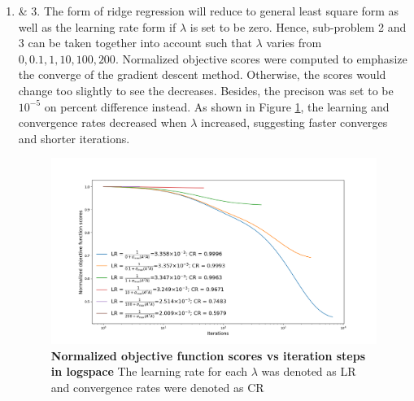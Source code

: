 \documentclass[11pt]{article}
\newcommand{\mfile}[1]  {{\small }} %
\begin{document}
\begin{enumerate}
		\item \& 3.
		The form of ridge regression will reduce to general least square form as well as the learning rate form if $\lambda$ is set to be zero. Hence, sub-problem 2 and 3 can be taken together into account such that $\lambda$ varies from $0,0.1,1,10,100,200$. Normalized objective scores were computed to emphasize the converge of the gradient descent method. Otherwise, the scores would change too slightly to see the decreases. Besides, the precison was set to be $10^{-5}$ on percent difference instead. As shown in Figure \ref{fig:p2}, the learning and convergence rates decreased when $\lambda$ increased, suggesting faster converges and shorter iterations.
		\begin{figure}
			\centering\includegraphics[width=.75\linewidth]{prob3.png}
			\caption{ \textbf{Normalized objective function scores vs iteration steps in logspace} The learning rate for each $\lambda$ was denoted as LR and convergence rates were denoted as CR} %
			\label{fig:p2}
		\end{figure}
	\mfile{prob3-fix.py}
	\end{enumerate}
\end{document}
